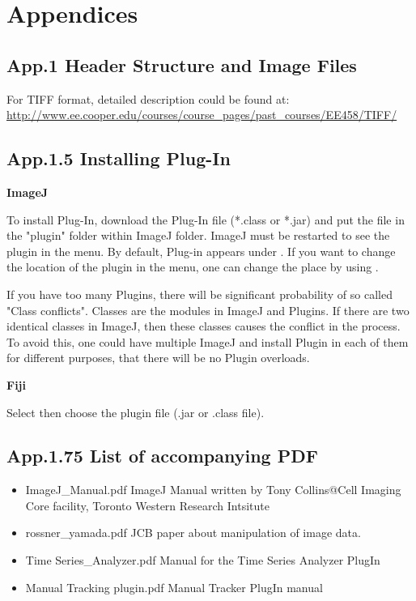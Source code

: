 
\section{Appendices}

\subsection{App.1 Header Structure and Image Files}
\label{app1}

For TIFF format, detailed description could be found at:\\
\url{http://www.ee.cooper.edu/courses/course_pages/past_courses/EE458/TIFF/}

\clearpage

\subsection{App.1.5 Installing Plug-In}
\label{app1.5}
\textbf{ImageJ}

To install Plug-In, download the Plug-In file (*.class or *.jar) and put the file
in the "plugin" folder within ImageJ folder. 
ImageJ must be restarted to see the plugin in the menu. 
By default, Plug-in appears under
\ijmenu{[Plugins]}.
If you want to change the location of the plugin in the menu, one can
change the place by using .

If you have too many Plugins, there will be significant probability of so called
"Class conflicts". Classes are the modules in ImageJ and Plugins. 
If there are two identical classes in
ImageJ, then these classes causes the conflict in the process. To avoid
this, one could have multiple ImageJ and install Plugin in each
of them for different purposes, that there will be no Plugin overloads. 

\textbf{Fiji}

Select   then choose the
plugin file (.jar or .class file). 


\clearpage
\subsection{App.1.75 List of accompanying PDF}
\label{app1.75}
\begin{itemize}
\item ImageJ\_Manual.pdf 
\subitem ImageJ Manual written by Tony Collins@Cell Imaging Core facility,
Toronto Western Research Intsitute

\item rossner\_yamada.pdf
\subitem JCB paper about manipulation of image data.

\item Time Series\_Analyzer.pdf
\subitem Manual for the Time Series Analyzer PlugIn 

\item Manual Tracking plugin.pdf
\subitem Manual Tracker PlugIn manual
\end{itemize}


